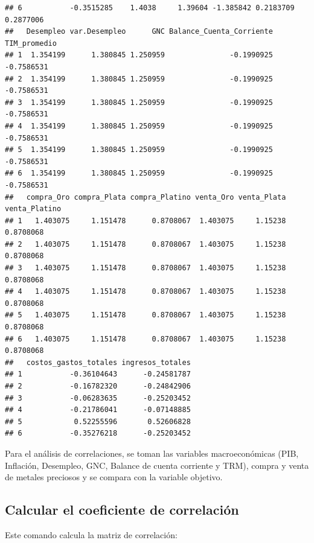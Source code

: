\documentclass[
  11pt,
  a4paper,
]{book}
\begin{document}
\begin{verbatim}
## 6           -0.3515285    1.4038     1.39604 -1.385842 0.2183709 0.2877006
##   Desempleo var.Desempleo      GNC Balance_Cuenta_Corriente TIM_promedio
## 1  1.354199      1.380845 1.250959               -0.1990925   -0.7586531
## 2  1.354199      1.380845 1.250959               -0.1990925   -0.7586531
## 3  1.354199      1.380845 1.250959               -0.1990925   -0.7586531
## 4  1.354199      1.380845 1.250959               -0.1990925   -0.7586531
## 5  1.354199      1.380845 1.250959               -0.1990925   -0.7586531
## 6  1.354199      1.380845 1.250959               -0.1990925   -0.7586531
##   compra_Oro compra_Plata compra_Platino venta_Oro venta_Plata venta_Platino
## 1   1.403075     1.151478      0.8708067  1.403075     1.15238     0.8708068
## 2   1.403075     1.151478      0.8708067  1.403075     1.15238     0.8708068
## 3   1.403075     1.151478      0.8708067  1.403075     1.15238     0.8708068
## 4   1.403075     1.151478      0.8708067  1.403075     1.15238     0.8708068
## 5   1.403075     1.151478      0.8708067  1.403075     1.15238     0.8708068
## 6   1.403075     1.151478      0.8708067  1.403075     1.15238     0.8708068
##   costos_gastos_totales ingresos_totales
## 1           -0.36104643      -0.24581787
## 2           -0.16782320      -0.24842906
## 3           -0.06283635      -0.25203452
## 4           -0.21786041      -0.07148885
## 5            0.52255596       0.52606828
## 6           -0.35276218      -0.25203452
\end{verbatim}

Para el análisis de correlaciones, se toman las variables
macroeconómicas (PIB, Inflación, Desempleo, GNC, Balance de cuenta
corriente y TRM), compra y venta de metales preciosos y se compara con
la variable objetivo.

\hypertarget{calcular-el-coeficiente-de-correlaciuxf3n}{%
\subsection{Calcular el coeficiente de
correlación}\label{calcular-el-coeficiente-de-correlaciuxf3n}}

Este comando calcula la matriz de correlación:
\end{document}
